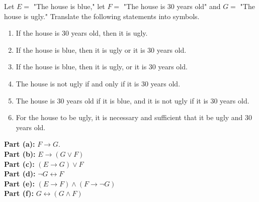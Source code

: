 \documentclass[11pt]{article}
\begin{document}
\begin{homeworkProblem}

Let $E = $ "The house is blue," let $F = $ "The house is 30 years old" and $G = $ "The house is ugly." Translate the following statements into symbols.

\begin{enumerate}[label=(\alph*), topsep=5pt, itemsep=2pt]
    \item If the house is 30 years old, then it is ugly.
    \item If the house is blue, then it is ugly or it is 30 years old.
    \item If the house is blue, then it is ugly, or it is 30 years old.
    \item The house is not ugly if and only if it is 30 years old.
    \item The house is 30 years old if it is blue, and it is not ugly if it is 30 years old.
    \item For the house to be ugly, it is necessary and sufficient that it be ugly and 30 years old.
\end{enumerate} \vspace{1\baselineskip}

\solution

\textbf{Part (a):} $F \rightarrow G$.\\

\textbf{Part (b):} $E \rightarrow (G \lor F)$ \\

\textbf{Part (c):} $(E \rightarrow G) \lor F$ \\
 
\textbf{Part (d):} $\lnot G \leftrightarrow F$ \\

\textbf{Part (e):} $(E \rightarrow F) \land (F \rightarrow \lnot G)$ \\

\textbf{Part (f):} $G \leftrightarrow (G \land F)$

\end{homeworkProblem}

\pagebreak
\end{document}
